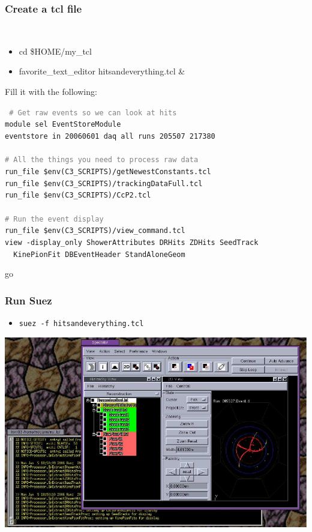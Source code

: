 \documentclass[12pt,compress]{beamer}
\begin{document}
\begin{frame}
\frametitle{Create a tcl file}

{\tt \scriptsize
\begin{itemize}
\item cd \$HOME/my\_tcl
\item favorite\_text\_editor hitsandeverything.tcl \&
\end{itemize}}

\vfill
Fill it with the following:

\vspace{0.5 cm}
\hspace{0.5 cm} \begin{minipage}{0.9\linewidth}
\tt \scriptsize
\textcolor{gray}{\# Get raw events so we can look at hits} \\
module sel EventStoreModule \\
eventstore in 20060601 daq all runs 205507 217380 \\
\mbox{ } \\
\textcolor{gray}{\# All the things you need to process raw data} \\
run\_file \$env(C3\_SCRIPTS)/getNewestConstants.tcl \\
run\_file \$env(C3\_SCRIPTS)/trackingDataFull.tcl \\
run\_file \$env(C3\_SCRIPTS)/CcP2.tcl \\
\mbox{ } \\
\textcolor{gray}{\# Run the event display} \\
run\_file \$env(C3\_SCRIPTS)/view\_command.tcl \\
view -display\_only ShowerAttributes DRHits ZDHits SeedTrack \\
\mbox{ } \hfill KinePionFit DBEventHeader StandAloneGeom

go
\end{minipage}
\end{frame}

\begin{frame}
\frametitle{Run Suez}

\begin{itemize}
\item {\tt suez -f hitsandeverything.tcl}
\end{itemize}

\begin{center}
\includegraphics[width=\linewidth]{eventdisplay2}
\end{center}
\end{frame}
\end{document}
